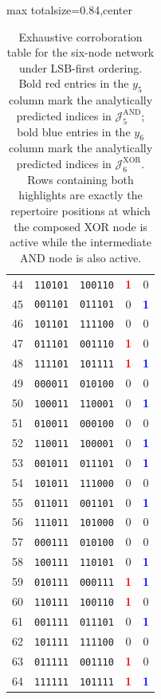 \documentclass[11pt]{article}
\theoremstyle{definition}
\newcommand{\J}{\mathcal{J}}
\begin{document}
\begin{table}[p]
\begin{adjustbox}{max totalsize={\textwidth}{0.84\textheight},center}
\begin{tabular}{@{}rcccc@{}}
44 & \texttt{110101} & \texttt{100110} & \textbf{\textcolor{red}{1}} & 0 \\
45 & \texttt{001101} & \texttt{011101} & 0 & \textbf{\textcolor{blue}{1}} \\
46 & \texttt{101101} & \texttt{111100} & 0 & 0 \\
47 & \texttt{011101} & \texttt{001110} & \textbf{\textcolor{red}{1}} & 0 \\
48 & \texttt{111101} & \texttt{101111} & \textbf{\textcolor{red}{1}} & \textbf{\textcolor{blue}{1}} \\
49 & \texttt{000011} & \texttt{010100} & 0 & 0 \\
50 & \texttt{100011} & \texttt{110001} & 0 & \textbf{\textcolor{blue}{1}} \\
51 & \texttt{010011} & \texttt{000100} & 0 & 0 \\
52 & \texttt{110011} & \texttt{100001} & 0 & \textbf{\textcolor{blue}{1}} \\
53 & \texttt{001011} & \texttt{011101} & 0 & \textbf{\textcolor{blue}{1}} \\
54 & \texttt{101011} & \texttt{111000} & 0 & 0 \\
55 & \texttt{011011} & \texttt{001101} & 0 & \textbf{\textcolor{blue}{1}} \\
56 & \texttt{111011} & \texttt{101000} & 0 & 0 \\
57 & \texttt{000111} & \texttt{010100} & 0 & 0 \\
58 & \texttt{100111} & \texttt{110101} & 0 & \textbf{\textcolor{blue}{1}} \\
59 & \texttt{010111} & \texttt{000111} & \textbf{\textcolor{red}{1}} & \textbf{\textcolor{blue}{1}} \\
60 & \texttt{110111} & \texttt{100110} & \textbf{\textcolor{red}{1}} & 0 \\
61 & \texttt{001111} & \texttt{011101} & 0 & \textbf{\textcolor{blue}{1}} \\
62 & \texttt{101111} & \texttt{111100} & 0 & 0 \\
63 & \texttt{011111} & \texttt{001110} & \textbf{\textcolor{red}{1}} & 0 \\
64 & \texttt{111111} & \texttt{101111} & \textbf{\textcolor{red}{1}} & \textbf{\textcolor{blue}{1}} \\
\bottomrule
\end{tabular}
\end{adjustbox}
\caption{Exhaustive corroboration table for the six-node network under LSB-first ordering. Bold red entries in the \(y_5\) column mark the analytically predicted indices in \(\J_5^{\mathrm{AND}}\); bold blue entries in the \(y_6\) column mark the analytically predicted indices in \(\J_6^{\mathrm{XOR}}\). Rows containing both highlights are exactly the repertoire positions at which the composed XOR node is active while the intermediate AND node is also active.}
\label{tab:corroboration-exhaustive}
\end{table}
\end{document}

